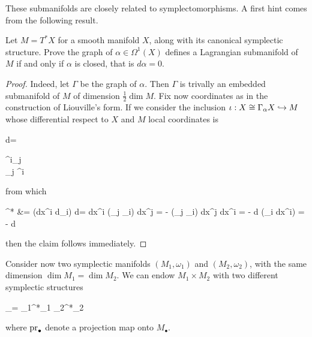 \documentclass[main.tex]{subfiles}
\begin{document}
These submanifolds are closely related to symplectomorphisms. A first hint comes from the following result.

\begin{exercise}
\label{ex:lagrangian_submanifolds_of_cotangent_bundles}
	Let $M = T^*X$ for a smooth manifold $X$, along with its canonical symplectic structure. Prove the graph of $\alpha \in \Omega^1(X)$ defines a Lagrangian submanifold of $M$ if and only if $\alpha$ is closed, that is $d\alpha =0$.
\end{exercise}
\begin{proof}
	Indeed, let $\Gamma$ be the graph of $\alpha$. Then $\Gamma$ is trivally an embedded submanifold of $M$ of dimension $\frac12 \dim M$. Fix now coordinates as in the construction of Liouville's form. If we consider the inclusion $\iota : X \overset{}{\cong} \Gamma_\alpha X \hookrightarrow M$ whose differential respect to $X$ and $M$ local coordinates is 
	\begin{eqalign}
		d\iota = \begin{pmatrix}
			\delta^i_j \\
			\partial_j \alpha^i
		\end{pmatrix}
	\end{eqalign}
	from which
	\begin{eqalign}
		\iota^* \omega &= (dx^i \wedge d\xi_i) \circ d\iota = dx^i \wedge (\partial_j \alpha_i) dx^j = - (\partial_j \alpha_i) dx^j \wedge dx^i = - d (\alpha_i dx^i) = - d\alpha
	\end{eqalign}
	then the claim follows immediately.
\end{proof}

Consider now two symplectic manifolds $(M_1,\omega_1)$ and $(M_2, \omega_2)$, with the same dimension $\dim M_1 = \dim M_2$. We can endow $M_1 \times M_2$ with two different symplectic structures
\begin{eqalign}
	\omega_\pm = \pr_1^*\omega_1 \pm \pr_2^*\omega_2
\end{eqalign}
where $\mathrm{pr}_\bullet$ denote a projection map onto $M_\bullet$.
\end{document}
